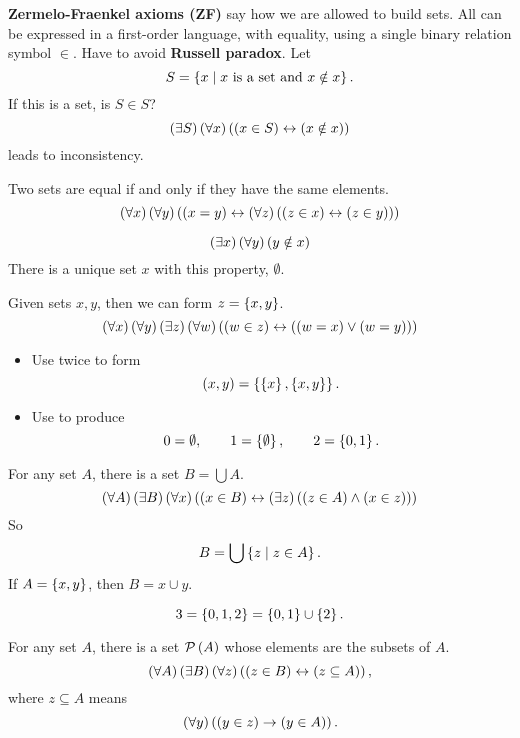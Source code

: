\textbf{Zermelo-Fraenkel axioms (ZF)} say how we are allowed to build sets. All can be expressed in a first-order language, with equality, using a single binary relation symbol $ \in $. Have to avoid \textbf{Russell paradox}. Let
$$ S = \cb{x \mid x \ \text{is a set and} \ x \notin x}. $$
If this is a set, is $ S \in S $?
$$ \teb{S}\fab{x}\iffb{\inb{x}{S}}{\nib{x}{x}} $$
leads to inconsistency.

\begin{axiom}
Two sets are equal if and only if they have the same elements.
$$ \fab{x}\fab{y}\iffb{\eqb{x}{y}}{\fab{z}\iffb{\inb{z}{x}}{\inb{z}{y}}} $$
\end{axiom}

\begin{axiom}
$$ \teb{x}\fab{y}\nib{y}{x} $$
There is a unique set $ x $ with this property, $ \emptyset $.
\end{axiom}


\begin{axiom}
Given sets $ x, y $, then we can form $ z = \cb{x, y} $.
$$ \fab{x}\fab{y}\teb{z}\fab{w}\iffb{\inb{w}{z}}{\orb{\eqb{w}{x}}{\eqb{w}{y}}} $$
\end{axiom}

\begin{remark*}
\hfill
\begin{itemize}
\item Use twice to form
$$ \rb{x, y} = \cb{\cb{x}, \cb{x, y}}. $$
\item Use to produce
$$ 0 = \emptyset, \qquad 1 = \cb{\emptyset}, \qquad 2 = \cb{0, 1}. $$
\end{itemize}
\end{remark*}

\begin{axiom}
For any set $ A $, there is a set $ B = \bigcup A $.
$$ \fab{A}\teb{B}\fab{x}\iffb{\inb{x}{B}}{\teb{z}\andb{\inb{z}{A}}{\inb{x}{z}}} $$
So
$$ B = \bigcup \cb{z \mid z \in A}. $$
If $ A = \cb{x, y} $, then $ B = x \cup y $.
\end{axiom}

\begin{example*}
$$ 3 = \cb{0, 1, 2} = \cb{0, 1} \cup \cb{2}. $$
\end{example*}

\begin{axiom}
For any set $ A $, there is a set $ \PP\rb{A} $ whose elements are the subsets of $ A $.
$$ \fab{A}\teb{B}\fab{z}\iffb{\inb{z}{B}}{\subb{z}{A}}, $$
where $ z \subseteq A $ means
$$ \fab{y}\impb{\inb{y}{z}}{\inb{y}{A}}. $$
\end{axiom}

